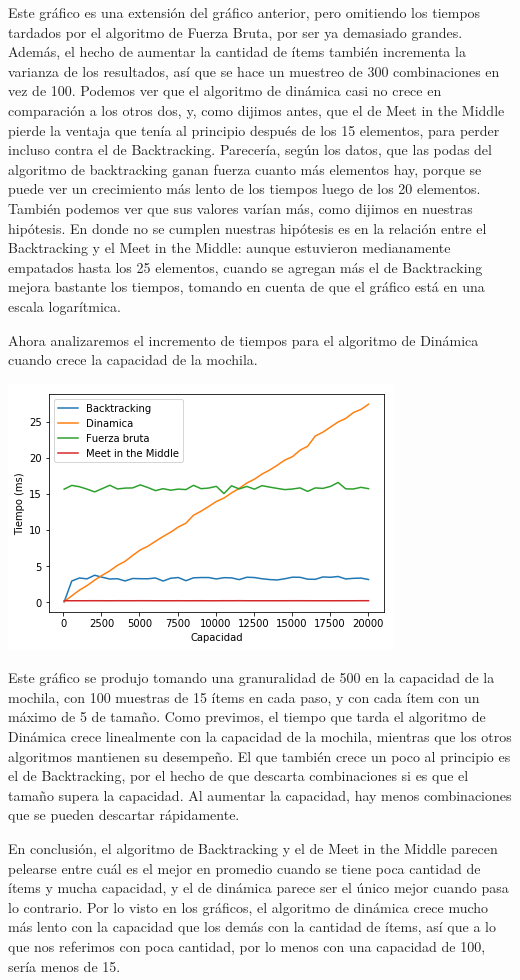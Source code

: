 \documentclass[10pt, a4paper]{article}
\begin{document}
Este gráfico es una extensión del gráfico anterior, pero omitiendo los tiempos tardados por el algoritmo de Fuerza Bruta, por ser ya demasiado grandes. Además, el hecho de aumentar la cantidad de ítems también incrementa la varianza de los resultados, así que se hace un muestreo de 300 combinaciones en vez de 100. Podemos ver que el algoritmo de dinámica casi no crece en comparación a los otros dos, y, como dijimos antes, que el de Meet in the Middle pierde la ventaja que tenía al principio después de los 15 elementos, para perder incluso contra el de Backtracking. Parecería, según los datos, que las podas del algoritmo de backtracking ganan fuerza cuanto más elementos hay, porque se puede ver un crecimiento más lento de los tiempos luego de los 20 elementos. También podemos ver que sus valores varían más, como dijimos en nuestras hipótesis. En donde no se cumplen nuestras hipótesis es en la relación entre el Backtracking y el Meet in the Middle: aunque estuvieron medianamente empatados hasta los 25 elementos, cuando se agregan más el de Backtracking mejora bastante los tiempos, tomando en cuenta de que el gráfico está en una escala logarítmica.\par
Ahora analizaremos el incremento de tiempos para el algoritmo de Dinámica cuando crece la capacidad de la mochila.\par
\includegraphics{aumentocapacidad15itemshasta20000.png}

Este gráfico se produjo tomando una granuralidad de 500 en la capacidad de la mochila, con 100 muestras de 15 ítems en cada paso, y con cada ítem con un máximo de 5 de tamaño. Como previmos, el tiempo que tarda el algoritmo de Dinámica crece linealmente con la capacidad de la mochila, mientras que los otros algoritmos mantienen su desempeño. El que también crece un poco al principio es el de Backtracking, por el hecho de que descarta combinaciones si es que el tamaño supera la capacidad. Al aumentar la capacidad, hay menos combinaciones que se pueden descartar rápidamente.\par
En conclusión, el algoritmo de Backtracking y el de Meet in the Middle parecen pelearse entre cuál es el mejor en promedio cuando se tiene poca cantidad de ítems y mucha capacidad, y el de dinámica parece ser el único mejor cuando pasa lo contrario. Por lo visto en los gráficos, el algoritmo de dinámica crece mucho más lento con la capacidad que los demás con la cantidad de ítems, así que a lo que nos referimos con poca cantidad, por lo menos con una capacidad de 100, sería menos de 15.
\end{document}
